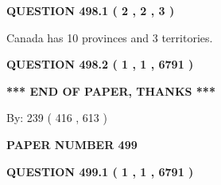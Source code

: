 \documentclass[12pt]{article}
\begin{document}
   
 \vspace{0.2in}
 
 
 
 
   
   
  
\vspace{0.2in}
  
{\textbf{\Large{QUESTION
498.1 
 ( 2 , 2 , 3 )
}}}
  
  
 
 
\noindent{}
 
 
Canada has 10  provinces and 3 territories.
 
 
 
 
  
\vspace{0.2in}
  
{\textbf{\Large{QUESTION
498.2 
 ( 1 , 1 , 6791 )
}}}
  
  
   
   
 \vspace{0.2in}
 
   
   
   
   
\vspace{1.0in} 
{\textbf{\large{ *** END OF PAPER, THANKS *** }}} 
   
   
\hspace{1.0in} By: 
 239 ( 416 ,  613 )
   
   
   
   
\newpage 
\setcounter{page}{ 
   499001 } 
   
   
   
   
 {\textbf{ \Large{ PAPER NUMBER  499  }}}
   
   
\vspace{0.2in}
   
   
   
   
   
   
 \vspace{0.2in}
 
 
 
 
   
   
  
\vspace{0.2in}
  
{\textbf{\Large{QUESTION
499.1 
 ( 1 , 1 , 6791 )
}}}
  
  
  
\end{document}
